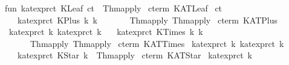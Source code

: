 \begin{isabellebody}
\isanewline
fun\ kat{}expr{}ct\ {}KLeaf\ ct{}\ {}\ Thm{}apply\ %
\isaantiq
cterm\ KATLeaf{}%
\endisaantiq
\ ct\isanewline
\ \ {}\ kat{}expr{}ct\ {}KPlus\ {}k{}{}\ k{}{}{}\ {}\isanewline
\ \ \ \ \ \ Thm{}apply\ {}Thm{}apply\ %
\isaantiq
cterm\ KATPlus{}%
\endisaantiq
\ {}kat{}expr{}ct\ k{}{}{}\ {}kat{}expr{}ct\ k{}{}\isanewline
\ \ {}\ kat{}expr{}ct\ {}KTimes\ {}k{}{}\ k{}{}{}\ {}\isanewline
\ \ \ \ \ \ Thm{}apply\ {}Thm{}apply\ %
\isaantiq
cterm\ KATTimes{}%
\endisaantiq
\ {}kat{}expr{}ct\ k{}{}{}\ {}kat{}expr{}ct\ k{}{}\isanewline
\ \ {}\ kat{}expr{}ct\ {}KStar\ k{}\ {}\ Thm{}apply\ %
\isaantiq
cterm\ KATStar{}%
\endisaantiq
\ {}kat{}expr{}ct\ k{}\isanewline

\end{isabellebody}
